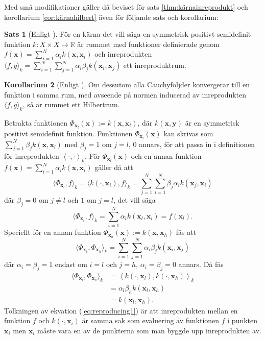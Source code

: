 \documentclass[a4paper, 12pt]{report}
\theoremstyle{definition}
\newtheorem{thm}{Sats}[section]
\newtheorem{cor}[thm]{Korollarium}
\theoremstyle{remark}
\newcommand{\bfx}{\mathbf{x}}
\newcommand{\bfy}{\mathbf{y}}
\newcommand{\llangle}{\left\langle}
\newcommand{\rrangle}{\right\rangle}
\newcommand{\inner}[2]{\llangle #1, #2 \rrangle}
\begin{document}
Med små modifikationer gäller då beviset för sats \ref{thm:kärnainreprodukt} och korollarium \ref{cor:kärnahilbert} även för följande sats och korollarium:
\begin{thm}[Enligt \cite{LearningKernels}]
	För en kärna det vill säga en symmetrisk positivt semidefinit funktion $k: X \times X \longmapsto \mathbb{R}$ är rummet med funktioner definierade genom $f\left(\bfx\right) = \sum_{i=1}^{N}\alpha_ik\left(\bfx, \bfx_i\right)$ och inreprodukten $\langle f, g\rangle_k = \sum_{i=1}^{N}\sum_{j=1}^{N} \alpha_i\beta_jk\left(\bfx_i, \bfx_j\right)$ ett inreproduktrum.
\end{thm}
\begin{cor}[Enligt \cite{LearningKernels}]
	Om dessutom alla Cauchyföljder konvergerar till en funktion i samma rum, med avseende på normen inducerad av inreprodukten $\langle f, g\rangle_k$, så är rummet ett Hilbertrum.
\end{cor}
Betrakta funktionen $\Phi_{\bfx_l}(\bfx):=k\left(\bfx, \bfx_l\right)$,  där $k\left(\bfx, \bfy\right)$ är en symmetrisk positivt semidefinit funktion.  Funktionen $\Phi_{\bfx_l}\!(\bfx)$ kan skrivas som $\sum_{j=1}^{N}\!\beta_jk\left(\bfx, \bfx_l\right)$ med $\beta_j=1$ om $j=l$, 0 annars, för att passa in i definitionen för inreprodukten $\inner{\cdot}{\cdot}_k$. För $\Phi_{\bfx_l}(\bfx)$ och en annan funktion $f\left(\bfx\right) = \sum_{i=1}^{N}\alpha_ik\left(\bfx, \bfx_i\right)$ gäller då att
	\begin{equation*}
		\langle \Phi_{\bfx_l}, f\rangle_k = \langle k\left(\cdot, \bfx_i\right), f\rangle_k = \sum_{j=1}^{N}\sum_{i=1}^{N}\beta_j\alpha_i k\left(\bfx_j, \bfx_i\right)
	\end{equation*}
	där $\beta_j = 0$ om $j\neq l$ och $1$ om $j=l$, det vill säga
	\begin{equation}\label{eq:reproducing1}
		\langle \Phi_{\bfx_l}, f\rangle_k = \sum_{i=1}^{N}\alpha_i k\left(\bfx_l, \bfx_i\right) = f\left(\bfx_l\right).
	\end{equation}
	Speciellt för en annan funktion $\Phi_{\bfx_h}(\bfx):=k\left(\bfx, \bfx_h\right)$ fås att
	\begin{equation*}
		\langle \Phi_{\bfx_l}, \Phi_{\bfx_h} \rangle_k = \sum_{i=1}^{N}\sum_{j=1}^{N}\alpha_i\beta_jk\left(\bfx_i, \bfx_j\right)
	\end{equation*}
	där $\alpha_i=\beta_j=1$ endast om $i=l$ och $j=h$, $\alpha_i=\beta_j=0$ annars. Då fås
	\begin{equation}\label{eq:reproducing2}
	\begin{aligned}
	\langle \Phi_{\bfx_l}, \Phi_{\bfx_h} \rangle_k &= \inner{k\left(\cdot, \bfx_l\right)}{k\left(\cdot, \bfx_h\right)}_k\\ &= \alpha_l\beta_hk\left(\bfx_l, \bfx_h\right)\\&= k\left(\bfx_l, \bfx_h\right).
	\end{aligned}
	\end{equation}
Tolkningen av ekvation (\ref{eq:reproducing1}) är att inreprodukten mellan en funktion $f$ och $k\left(\cdot, \bfx_i\right)$ är samma sak som evaluering av funktionen $f$ i punkten $\bfx_i$ men $\bfx_i$ måste vara en av de punkterna som man byggde upp inreprodukten av.
\end{document}
